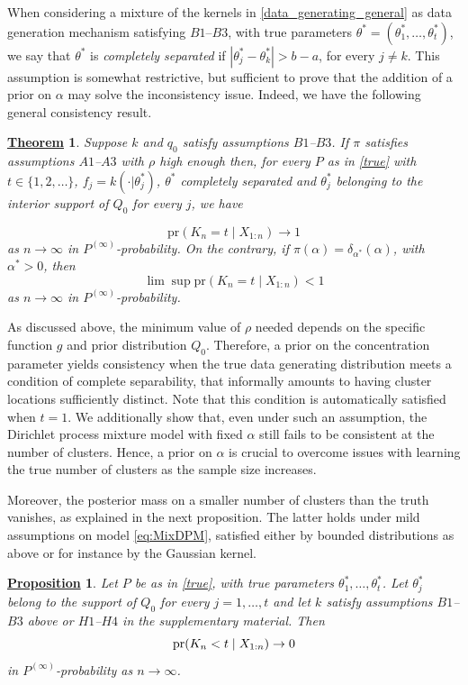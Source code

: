 \documentclass[12pt]{article}
\newtheorem{Thm}{\underline{\bf Theorem}}
\newtheorem{Prop}{\underline{\bf Proposition}}
\begin{document}
When considering a mixture of the kernels in \eqref{data_generating_general} as data generation mechanism satisfying $B1$--$B3$, with true parameters $\theta^* = (\theta_1^*, \dots, \theta_t^*)$, we say that $\theta^*$ is \emph{completely separated} if $|\theta_j^*-\theta_k^*| > b-a$, for every $j \neq k$. This assumption is somewhat restrictive, but sufficient to prove that the addition of a prior on $\alpha$ may solve the inconsistency issue. Indeed, we have the following general consistency result.
\begin{Thm}\label{th:ConsBounded}
Suppose $k$ and $q_0$ satisfy assumptions $B1$--$B3$. If $\pi$ satisfies assumptions $A1$--$A3$ with $\rho$ high enough then, for every $P$ as in \eqref{true} with $t \in \{1, 2, \dots\}$, $f_j=k(\cdot|\theta^*_j)$, $\theta^*$ completely separated and $\theta^*_j$ belonging to the interior support of $Q_0$ for every $j$, we have

\[
\text{pr}(K_n = t \mid X_{1:n}) \to 1 %
\]
as $n \to \infty$ in $P^{(\infty)}$-probability. On the contrary, if %
$\pi(\alpha) = \delta_{\alpha^*}(\alpha)$, with $\alpha^* > 0$, then
\[
\lim \sup \text{pr}(K_n = t \mid X_{1:n}) < 1
\]
as $n \to \infty$ in $P^{(\infty)}$-probability.
\end{Thm}
As discussed above, the minimum value of $\rho$ needed depends on the specific function $g$ and prior distribution $Q_0$. Therefore, a prior on the concentration parameter yields consistency when the true data generating distribution meets a condition of complete separability, that informally amounts to having cluster locations sufficiently distinct. Note that this condition is automatically satisfied when $t=1$. We additionally show that, even under such an assumption, the Dirichlet process mixture model with fixed $\alpha$ still fails to be consistent at the number of clusters. 
Hence, a prior on $\alpha$ %
is crucial to overcome issues with learning the true number of clusters as the sample size increases.

Moreover, the posterior mass on a smaller number of clusters than the truth vanishes, as explained in the next proposition. The latter holds under mild assumptions on model \eqref{eq:MixDPM}, satisfied either by bounded distributions as above or for instance by the Gaussian kernel.

\newpage
\begin{Prop}\label{undersmoothing}
Let $P$ be as in \eqref{true}, with true parameters $\theta^*_1, \dots, \theta^*_t$. Let $\theta_j^*$ belong to the support of $Q_0$ for every $j = 1, \dots, t$ and let $k$ satisfy assumptions $B1$--$B3$ above or $H1$--$H4$ in the supplementary material. Then
\begin{equation}
\text{\rm pr}(K_n < t \mid X_{1:n}) \to 0
\end{equation}
 in $P^{(\infty)}$-probability as $n \to \infty$.
\end{Prop}
\end{document}
